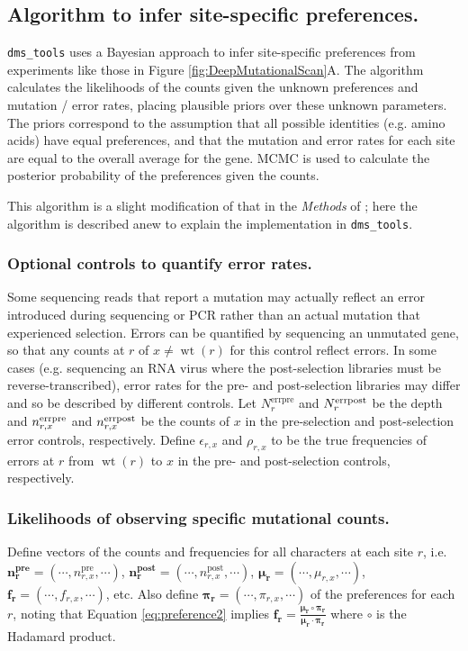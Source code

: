 \documentclass[twocolumn]{bmcart}%
\begin{document}
\subsection*{Algorithm to infer site-specific preferences.}
\texttt{dms\_tools} uses a Bayesian approach to infer site-specific preferences from experiments like those in Figure \ref{fig:DeepMutationalScan}A. The algorithm calculates the likelihoods of the counts given the unknown preferences and mutation / error rates, placing plausible priors over these unknown parameters. The priors correspond to the assumption that all possible identities (e.g. amino acids) have equal preferences, and that the mutation and error rates for each site are equal to the overall average for the gene. MCMC is used to calculate the posterior probability of the preferences given the counts.

This algorithm is a slight modification of that in the \textsl{Methods} of \cite{bloom2014experimentally}; here the algorithm is described anew to explain the implementation in \texttt{dms\_tools}. 

\subsubsection*{Optional controls to quantify error rates.}
Some sequencing reads that report a mutation may actually reflect an error introduced during sequencing or PCR rather than an actual mutation that experienced selection. Errors can be quantified by sequencing an unmutated gene, so that any counts at $r$ of $x \ne \operatorname{wt}\left(r\right)$ for this control reflect errors. In some cases (e.g. sequencing an RNA virus where the post-selection libraries must be reverse-transcribed), error rates for the pre- and post-selection libraries may differ and so be described by different controls. Let $N_r^{\textrm{errpre}}$ and $N_r^{\rm{errpost}}$ be the depth and $n_{r,x}^{\rm{errpre}}$ and $n_{r,x}^{\rm{errpost}}$ be the counts of $x$ in the pre-selection and post-selection error controls, respectively. Define $\epsilon_{r,x}$ and $\rho_{r,x}$ to be the true frequencies of errors at $r$ from $\operatorname{wt}\left(r\right)$ to $x$ in the pre- and post-selection controls, respectively. 

\subsubsection*{Likelihoods of observing specific mutational counts.}
Define vectors of the counts and frequencies for all characters at each site $r$, i.e. $\mathbf{n_r^{\textbf{pre}}}= \left(\cdots, n_{r,x}^{\textrm{pre}}, \cdots\right)$, $\mathbf{n_r^{\textbf{post}}}= \left(\cdots, n_{r,x}^{\textrm{post}}, \cdots\right)$, $\boldsymbol{\mathbf{\mu_r}} = \left(\cdots, \mu_{r,x}, \cdots\right)$, $\boldsymbol{\mathbf{f_r}} = \left(\cdots, f_{r,x}, \cdots\right)$, etc. Also define $\boldsymbol{\mathbf{\pi_r}}= \left(\cdots, \pi_{r,x}, \cdots\right)$ of the preferences for each $r$, noting that Equation \ref{eq:preference2} implies $\boldsymbol{\mathbf{f_r}} = \frac{\boldsymbol{\mathbf{\mu_r}}\circ\boldsymbol{\mathbf{\pi_r}}}{\boldsymbol{\mathbf{\mu_r}}\cdot \boldsymbol{\mathbf{\pi_r}}}$ where $\circ$ is the Hadamard product.
\end{document}
